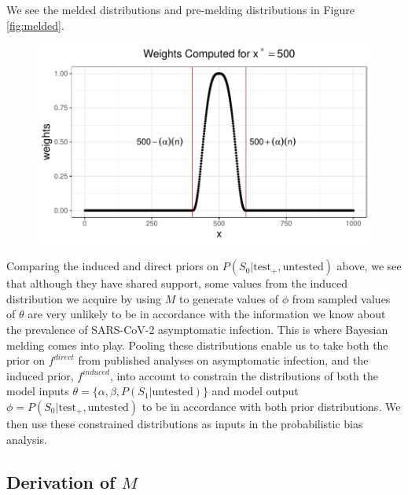 \documentclass[12pt,twoside]{smiththesis}
\begin{document}
We see the melded distributions and pre-melding distributions in Figure \ref{fig:melded}.
\begin{figure}

{\centering \includegraphics{thesis_files/figure-latex/unnamed-chunk-20-1} 

}

\caption{\label{fig:melded}}\label{fig:unnamed-chunk-20}
\end{figure}
Comparing the induced and direct priors on \(P(S_0| \text{test}_+, \text{untested})\) above, we see that although they have shared support, some values from the induced distribution we acquire by using \(M\) to generate values of \(\phi\) from sampled values of \(\theta\) are very unlikely to be in accordance with the information we know about the prevalence of SARS-CoV-2 asymptomatic infection. This is where Bayesian melding comes into play. Pooling these distributions enable us to take both the prior on \(f^{direct}\) from published analyses on asymptomatic infection, and the induced prior, \(f^{induced}\), into account to constrain the distributions of both the model inputs \(\theta = \{ \alpha, \beta, P(S_1 | \text{untested})\}\) and model output \(\phi = P(S_0|\text{test}_+, \text{untested})\) to be in accordance with both prior distributions. We then use these constrained distributions as inputs in the probabilistic bias analysis.

\newpage

\hypertarget{derivation}{%
\subsection{\texorpdfstring{Derivation of \(M\)}{Derivation of M}}\label{derivation}}
\end{document}
